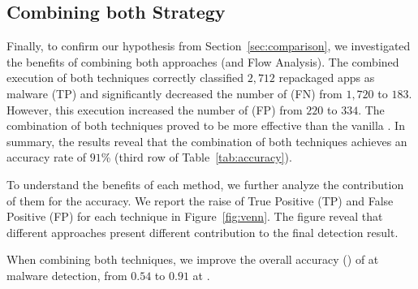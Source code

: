 \subsection{Combining both Strategy}\label{sec:strategy}

Finally, to confirm our hypothesis from Section~\ref{sec:comparison}, we investigated the benefits of combining both approaches (\mas and Flow Analysis). The combined execution of both techniques correctly classified $2,712$ repackaged apps as malware (TP) and significantly decreased the number of (FN) from $1,720$ to $183$. However, this execution increased the number of (FP) from $220$ to $334$. The combination of both techniques proved to be more effective than the vanilla \mas. In summary, the results reveal that the combination of both techniques achieves an accuracy rate of $91$\% (third row of Table~\ref{tab:accuracy}).

To understand the benefits of each method, we further analyze the contribution of them for the accuracy. We report the raise of True Positive (TP) and False Positive (FP) for each technique in Figure~\ref{fig:venn}. The figure reveal that different approaches present different contribution to the final detection result.

\begin{finding}
When combining both techniques, we improve the overall accuracy (\fone) of \mas at malware detection, from $0.54$ to $0.91$ at \cds.
\end{finding}

